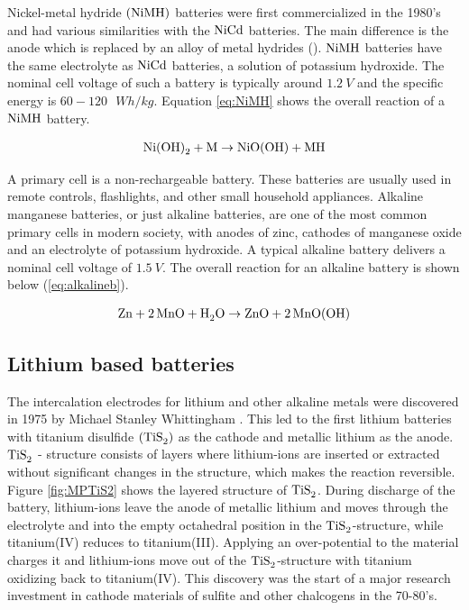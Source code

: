 Nickel-metal hydride $(\ce{NiMH})$  batteries were first commercialized in the 1980's and had various similarities with the $\ce{NiCd}$ batteries. The main difference is the anode which is replaced by an alloy of metal hydrides (). $\ce{NiMH}$ batteries have the same electrolyte as $\ce{NiCd}$ batteries, a solution of potassium hydroxide. The nominal cell voltage of such a battery is typically around $\SI{1.2}{V}$ and the specific energy is $60-120\text{ } \si{Wh/kg}$. Equation \ref{eq:NiMH} shows the overall reaction of a $\ce{NiMH}$ battery.

\begin{align}\label{eq:NiMH}
\ce{Ni(OH)_2} + \ce{M} \rightarrow \ce{NiO(OH)} + \ce{MH}
\end{align}

A primary cell is a non-rechargeable battery. These batteries are usually used in remote controls, flashlights, and other small household appliances. Alkaline manganese batteries, or just alkaline batteries, are one of the most common primary cells in modern society, with anodes of zinc, cathodes of manganese oxide and an electrolyte of potassium hydroxide. A typical alkaline battery delivers a nominal cell voltage of $\SI{1.5}{V}$. The overall reaction for an alkaline battery is shown below (\ref{eq:alkalineb}).

\begin{align}\label{eq:alkalineb}
\ce{Zn} + \ce{2MnO} +\ce{H_2O} \rightarrow \ce{ZnO} + \ce{2MnO(OH)}
\end{align}

\subsection{Lithium based batteries}

The intercalation electrodes for lithium and other alkaline metals were discovered in 1975 by Michael Stanley Whittingham \cite{whittingham1975lithium}. This led to the first lithium batteries with titanium disulfide $(\ce{TiS_2})$ as the cathode and metallic lithium as the anode. $\ce{TiS_2} $ - structure consists of layers where lithium-ions are inserted or extracted without significant changes in the structure, which makes the reaction reversible. Figure \ref{fig:MPTiS2} shows the layered structure of $\ce{TiS_2}$. During discharge of the battery, lithium-ions leave the anode of metallic lithium and moves through the electrolyte and into the empty octahedral position in the $\ce{TiS_2}$-structure, while titanium(IV) reduces to titanium(III). Applying an over-potential to the material charges it and lithium-ions move out of the $\ce{TiS_2}$-structure with titanium oxidizing back to titanium(IV). This discovery was the start of a major research investment in cathode materials of sulfite and other chalcogens in the 70-80's.


